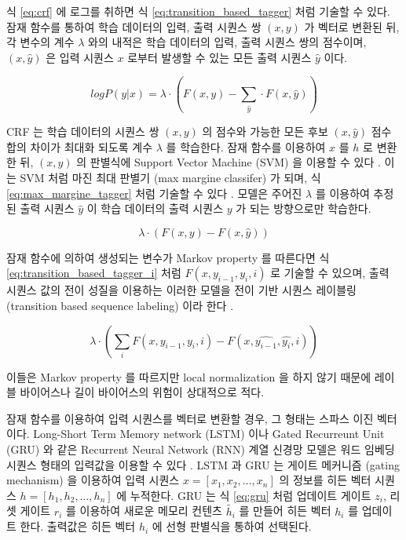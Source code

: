 \documentclass[11pt]{article}
\begin{document}
식 \ref{eq:crf} 에 로그를 취하면 식 \ref{eq:transition_based_tagger} 처럼 기술할 수 있다.
잠재 함수를 통하여 학습 데이터의 입력, 출력 시퀀스 쌍 $(x, y)$ 가 벡터로 변환된 뒤, 각 변수의 계수 $\lambda$ 와의 내적은 학습 데이터의 입력, 출력 시퀀스 쌍의 점수이며, $(x, \hat{y})$ 은 입력 시퀀스 $x$ 로부터 발생할 수 있는 모든 출력 시퀀스 $\hat{y}$ 이다.

\begin{equation}
  \label{eq:transition_based_tagger}
  log P(y \vert x) = \lambda \cdot \left( F(x, y) - \sum_{\hat{y}} \cdot F(x, \hat{y}) \right)
\end{equation}

CRF 는 학습 데이터의 시퀀스 쌍 $(x, y)$ 의 점수와 가능한 모든 후보 $(x, \hat{y})$ 점수 합의 차이가 최대화 되도록 계수 $\lambda$ 를 학습한다.
잠재 함수를 이용하여 $x$ 를 $h$ 로 변환한 뒤, $(x, y)$ 의 판별식에 Support Vector Machine (SVM) \citep{Cortes1995} 을 이용할 수 있다 \citep{tsochantaridis2005large}.
이는 SVM 처럼 마진 최대 판별기 (max margine classifer) 가 되며, 식 \ref{eq:max_margine_tagger} 처럼 기술할 수 있다 \citep{taskar2004max}.
모델은 주어진 $\lambda$ 를 이용하여 추정된 출력 시퀀스 $\hat{y}$ 이 학습 데이터의 출력 시퀀스 $y$ 가 되는 방향으로만 학습한다.

\begin{equation}
  \label{eq:max_margine_tagger}
  \lambda \cdot \left( F(x, y) - F(x, \hat{y}) \right)
\end{equation}

잠재 함수에 의하여 생성되는 변수가 Markov property 를 따른다면 식 \ref{eq:transition_based_tagger_i} 처럼 $F(x, y_{i-1}, y_{i}, i)$ 로 기술할 수 있으며, 출력 시퀀스 값의 전이 성질을 이용하는 이러한 모델을 전이 기반 시퀀스 레이블링 (transition based sequence labeling) 이라 한다 \citep{bohnet2012transition}.

\begin{equation}
  \label{eq:transition_based_tagger_i}
  \lambda \cdot \left( \sum_i F(x, y_{i-1}, y_i, i) - F(x, \hat{y_{i-1}}, \hat{y_i}, i) \right)
\end{equation}

이들은 Markov property 를 따르지만 local normalization 을 하지 않기 때문에 레이블 바이어스나 길이 바이어스의 위험이 상대적으로 적다.

잠재 함수를 이용하여 입력 시퀀스를 벡터로 변환할 경우, 그 형태는 스파스 이진 벡터이다.
Long-Short Term Memory network (LSTM) 이나 Gated Recurreunt Unit (GRU) 와 같은 Recurrent Neural Network (RNN) 계열 신경망 모델은 워드 임베딩 시퀀스 형태의 입력값을 이용할 수 있다 \citep{cho2014learning, hochreiter1997long}.
LSTM 과 GRU 는 게이트 메커니즘 (gating mechanism) 을 이용하여 입력 시퀀스 $x = [x_1, x_2, \dots, x_n]$ 의 정보를 히든 벡터 시퀀스 $h = [h_1, h_2, \dots, h_n]$ 에 누적한다.
GRU 는 식 \ref{eq:gru} 처럼 업데이트 게이트 $z_i$, 리셋 게이트 $r_i$ 를 이용하여 새로운 메모리 컨텐츠 $\tilde{h_i}$ 를 만들어 히든 벡터 $h_i$ 를 업데이트 한다.
출력값은 히든 벡터 $h_i$ 에 선형 판별식을 통하여 선택된다.
\end{document}
